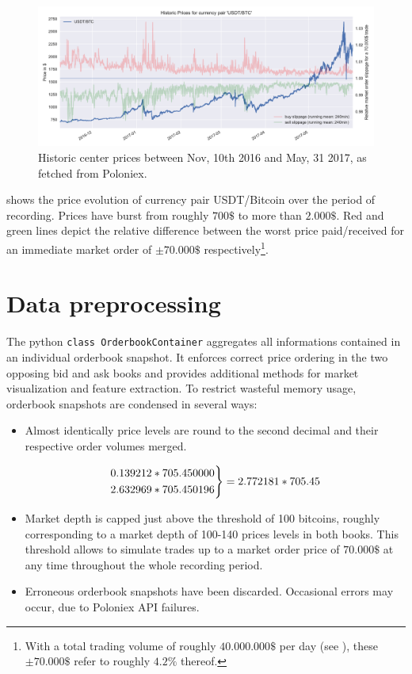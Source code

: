 \begin{figure}[ht]
	\centering
   \includegraphics[width=1.\textwidth]{content/drawings/bitcoin_historicPrices}
	\caption{Historic center prices between Nov, 10th 2016 and May, 31 2017, as fetched from Poloniex.}
	\label{fig:ploniexPriceHistory}
\end{figure}

 shows the price evolution of currency pair USDT/Bitcoin over the period of recording. Prices have burst from roughly $700\$$ to more than $2.000\$$. Red and green lines depict the relative difference between the worst price paid/received for an immediate market order of $\pm70.000\$$ respectively\footnote{With a total trading volume of roughly $40.000.000\$$ per day (see ), these $\pm70.000\$$ refer to roughly $4.2\%$ thereof.}.

\hspace{1cm}

\section{Data preprocessing}
\label{chap:preprocessing}
The python \lstinline!class OrderbookContainer! aggregates all informations contained in an individual orderbook snapshot. It enforces correct price ordering in the two opposing bid and ask books and provides additional methods for market visualization and feature extraction. To restrict wasteful memory usage, orderbook snapshots are condensed in several ways:

\begin{itemize}
\item Almost identically price levels are round to the second decimal and their respective order volumes merged.

 \[ 
  \begin{rcases}
    0.139212 * 705.450000\\
    2.632969 * 705.450196\\
  \end{rcases} 
  = 2.772181 * 705.45
\]
\item Market depth is capped just above the threshold of 100 bitcoins, roughly corresponding to a market depth of 100-140 prices levels in both books. This threshold allows to simulate trades up to a market order price of $70.000\$$ at any time throughout the whole recording period.

\item Erroneous orderbook snapshots have been discarded. Occasional errors may occur, due to Poloniex API failures.

\end{itemize}

